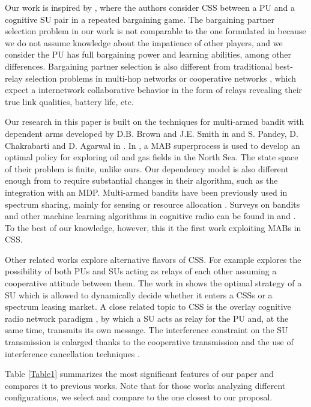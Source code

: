 Our work is inspired by \cite{ref:Yan2013}, where the authors consider CSS between a PU and a cognitive SU pair in a repeated bargaining game. 
The bargaining partner selection problem in our work is not comparable to the one formulated in \cite{ref:Calvo2002} because we do not assume knowledge about the impatience of other players, and we consider the PU has full bargaining power and learning abilities, among other differences. 
Bargaining partner selection is also different from traditional best-relay selection problems in multi-hop networks or cooperative networks \cite{ref:Yuan2013,ref:Tran2014}, which expect a internetwork collaborative behavior in the form of relays revealing their true link qualities, battery life, etc.

Our research in this paper is built on the techniques for multi-armed bandit with dependent arms developed by D.B. Brown and J.E. Smith in \cite{ref:Brown2013} and S. Pandey, D. Chakrabarti and D. Agarwal in \cite{ref:Pandey2007}. In \cite{ref:Brown2013}, a MAB superprocess is used to develop an optimal policy for exploring oil and gas fields in the North Sea. The state space of their problem is finite, unlike ours. 
Our dependency model is also different enough from \cite{ref:Pandey2007} to require substantial changes in their algorithm, such as the integration with an MDP. 
Multi-armed bandits have been previously used in spectrum sharing, mainly for sensing or resource allocation \cite{ref:Si2010}. 
Surveys on bandits and other machine learning algorithms in cognitive radio can be found in \cite{ref:Bkassiny2013} and \cite{ref:Gavrilovska2013}.
To the best of our knowledge, however, this it the first work exploiting MABs in CSS. 

Other related works explore alternative flavors of CSS. For example \cite{ref:Tran2014} explores the possibility of both PUs and SUs acting as relays of each other assuming a cooperative attitude between them. 
The work in \cite{ref:Shao2014} shows the optimal strategy of a SU which is allowed to dynamically decide whether it enters a CSSs or a spectrum leasing market. A close related topic to CSS is the overlay cognitive radio network paradigm \cite{ref:Goldsmith2009}, by which a SU acts as relay for the PU and, at the same time, transmits its own message. 
The interference constraint on the SU transmission is enlarged thanks to the cooperative transmission and the use of interference cancellation techniques \cite{ref:Han2010}. 

Table \ref{Table1} summarizes the most significant features of our paper and compares it to previous works. 
Note that for those works analyzing different configurations, we select and compare to the one closest to our proposal. 

